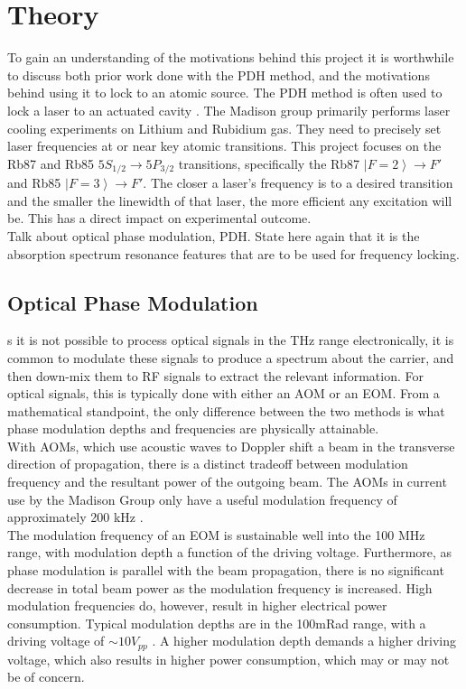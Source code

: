 \newpage
\section{Theory} \label{sec:theory}

To gain an understanding of the motivations behind this project it is worthwhile to discuss both prior work done with the PDH method, and the motivations behind using it to lock to an atomic source.  The PDH method is often used to lock a laser to an actuated cavity \cite{black1998}.  The Madison group primarily performs laser cooling experiments on Lithium and Rubidium gas.  They need to precisely set laser frequencies at or near key atomic transitions. This project focuses on the Rb87 and Rb85 $5S_{1/2} \rightarrow 5P_{3/2}$ transitions, specifically the Rb87 $\left|F=2\right\rangle \rightarrow F'$ and Rb85 $\left|F=3\right\rangle \rightarrow F'$.  The closer a laser's frequency is to a desired transition and the smaller the linewidth of that laser, the more efficient any excitation will be.  This has a direct impact on experimental outcome. \\

Talk about optical phase modulation, PDH. State here again that it is the absorption spectrum resonance features that are to be used for frequency locking.

\subsection{Optical Phase Modulation}

s it is not possible to process optical signals in the THz range electronically, it is common to modulate these signals to produce a spectrum about the carrier, and then down-mix them to RF signals to extract the relevant information. For optical signals, this is typically done with either an AOM or an EOM. From a mathematical standpoint, the only difference between the two methods is what phase modulation depths and frequencies are physically attainable. \\

With AOMs, which use acoustic waves to Doppler shift a beam in the transverse direction of propagation, there is a distinct tradeoff between modulation frequency and the resultant power of the outgoing beam.  The AOMs in current use by the Madison Group only have a useful modulation frequency of approximately 200 kHz \cite{madison14}. \\

The modulation frequency of an EOM is sustainable well into the 100 MHz range, with modulation depth a function of the driving voltage. Furthermore, as phase modulation is parallel with the beam propagation, there is no significant decrease in total beam power as the modulation frequency is increased. High modulation frequencies do, however, result in higher electrical power consumption. Typical modulation depths are in the 100mRad range, with a driving voltage of $\sim 10 V_{pp}$ \cite{thorlabs_eom}. A higher modulation depth demands a higher driving voltage, which also results in higher power consumption, which may or may not be of concern. \\

